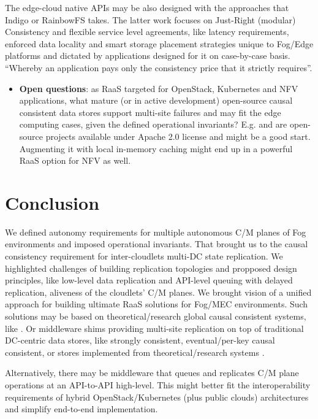 \documentclass[conference]{IEEEtran}
\begin{document}
The edge-cloud native APIs may be also designed with the approaches that
Indigo\cite{b10} or RainbowFS\cite{b7} takes. The latter work focuses on
Just-Right (modular) Consistency and flexible service level agreements, like
latency requirements, enforced data locality and smart storage placement
strategies unique to Fog/Edge platforms and dictated by applications designed
for it on case-by-case basis. ``Whereby an application pays only the
consistency price that it strictly requires''\cite{b7}.

\begin{itemize}
  \item \textbf{Open questions}: as RaaS targeted for OpenStack, Kubernetes and
    NFV applications, what mature (or in active development) open-source causal
    consistent data stores support multi-site failures and may fit the edge
    computing cases, given the defined operational invariants? E.g.\cite{b12}
    \cite{b20} and \cite{b23} are open-source projects available under
    Apache 2.0 license and might be a good start. Augmenting it with local
    in-memory caching might end up in a powerful RaaS option for NFV as well.
\end{itemize}

\section{Conclusion}
We defined autonomy requirements for multiple autonomous C/M planes of Fog
environments and imposed operational invariants. That brought us to the causal
consistency requirement for inter-cloudlets multi-DC state replication. We
highlighted challenges of building replication topologies and propposed design
principles, like low-level data replication and API-level queuing with delayed
replication, aliveness of the cloudlets' C/M planes. We brought vision of a
unified approach for building ultimate RaaS solutions for Fog/MEC environments.
Such solutions may be based on theoretical/research global causal consistent
systems, like \cite{b11}\cite{b12}. Or middleware shims providing multi-site
replication on top of traditional DC-centric data stores, like strongly
consistent\cite{b22}, eventual/per-key causal consistent\cite{b19}\cite{b20},
or stores implemented from theoretical/research systems
\cite{b1}\cite{b2}\cite{b7}\cite{b10}\cite{b13}\cite{b23}.

Alternatively, there may be middleware that queues and replicates C/M plane
operations at an API-to-API high-level. This might better fit the
interoperability requirements of hybrid OpenStack/Kubernetes (plus public
clouds) architectures and simplify end-to-end implementation.
\end{document}
